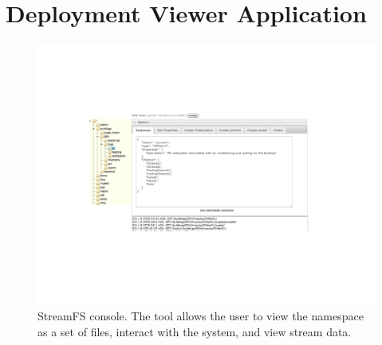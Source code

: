\section{Deployment Viewer Application}

\begin{figure}[htb!]
\begin{center}
\includegraphics[scale=0.6]{figs/sfs_console}
\caption{StreamFS console.  The tool allows the user to view the namespace as a set of files, interact with the system, and 
view stream data.}
\label{fig:aggtree}
\end{center}
\end{figure}
